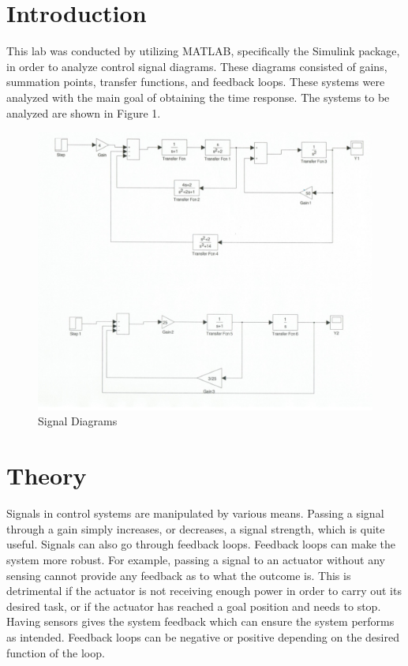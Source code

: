 \documentclass[12pt]{article}
\begin{document}

\section*{\fontsize{12}{12}\selectfont \large Introduction}
This lab was conducted by utilizing MATLAB, specifically the Simulink package, in order to analyze control signal diagrams. These diagrams consisted of gains, summation points, transfer functions, and feedback loops. These systems were analyzed with the main goal of obtaining the time response. The systems to be analyzed are shown in Figure 1. 
\bigskip
\bigskip

\begin{figure}[htbp] %
   \centering
   \includegraphics[width=\linewidth]{signal_diagrams.jpg} 
   \caption{Signal Diagrams}
   \label{fig:example}
\end{figure}

\newpage


\section*{\fontsize{12}{12}\selectfont \large Theory}
Signals in control systems are manipulated by various means. Passing a signal through a gain simply increases, or decreases, a signal strength, which is quite useful. Signals can also go through feedback loops. Feedback loops can make the system more robust. For example, passing a signal to an actuator without any sensing cannot provide any feedback as to what the outcome is. This is detrimental if the actuator is not receiving enough power in order to carry out its desired task, or if the actuator has reached a goal position and needs to stop. Having sensors gives the system feedback which can ensure the system performs as intended. Feedback loops can be negative or positive depending on the desired function of the loop. 
\bigskip
\end{document}
